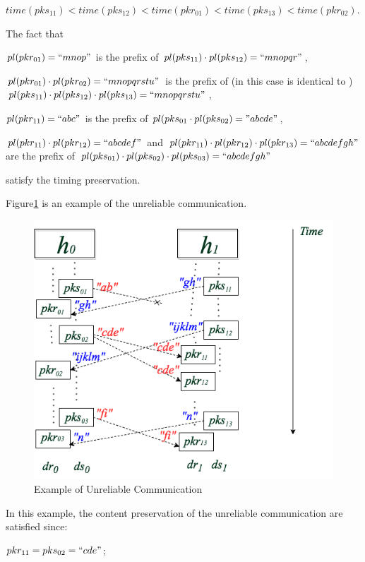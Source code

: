 $time(pks_{11}) < time(pks_{12}) < time(pkr_{01})< time(pks_{13}) < time(pkr_{02})$. 

The fact that
 
$pl(pkr_{01}) = ``mnop"$ is the prefix of $pl(pks_{11}) \cdot  pl(pks_{12}) = ``mnopqr"$,

$pl(pkr_{01}) \cdot pl(pkr_{02})=``mnopqrstu"$ is the prefix of (in this case is identical to ) $pl(pks_{11}) \cdot pl(pks_{12}) \cdot pl(pks_{13}) = ``mnopqrstu" $,  

$pl(pkr_{11})=``abc"$ is the prefix of $pl(pks_{01} \cdot pl(pks_{02}) = "abcde"$,  

$pl(pkr_{11}) \cdot pl(pkr_{12})= ``abcdef"$ and  $pl(pkr_{11}) \cdot pl(pkr_{12}) \cdot pl(pkr_{13}) = ``abcdefgh"$ are  the prefix of  $pl(pks_{01}) \cdot pl(pks_{02}) \cdot pl(pks_{03})= ``abcdefgh"$

satisfy the timing preservation. 


Figure\ref{unreliableexample} is an example of the unreliable communication. 

\begin{figure}[H]
\centerline{\includegraphics[scale=0.55]{Figures/unreliableexample}}
\caption{Example of Unreliable Communication}
\label{unreliableexample}
\end{figure}

In this example, the content preservation of the unreliable communication are satisfied since: 

$pkr_{11} = pks_{02}=``cde"$; 

